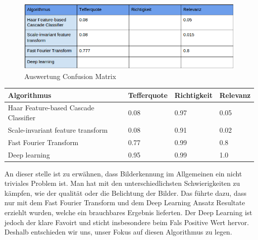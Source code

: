 \begin{figure}[ht]
\includegraphics[width=\textwidth]{images/auserwertung_conf.png}
\caption[Auswertung Confusion Matrix]{Auswertung Confusion Matrix}
\end{figure}

\begin{center}
    \begin{tabular}{ | p{3cm} | p{3cm}  | p{3cm} | p{3cm}  | }
    \hline    
    \rowcolor{lightblue}
	Algorithmus & Tefferquote & Richtigkeit & Relevanz \\ \hline
	Haar Feature-based Cascade Classifier & 0.08 & 0.97 & 0.05 \\ \hline
	Scale-invariant feature transform & 0.08 & 0.91 & 0.02 \\ \hline
	Fast Fourier Transform & 0.77 & 0.99 & 0.8 \\ \hline
	Deep learning & 0.95 & 0.99 & 1.0 \\ \hline
    \end{tabular}
\end{center}

An dieser stelle ist zu erwähnen, dass Bilderkennung im Allgemeinen ein nicht triviales Problem ist. Man hat mit den unterschiedlichsten Schwierigkeiten zu kämpfen, wie der qualität oder die Belichtung der Bilder. Das führte dazu, dass nur mit dem Fast Fourier Transform und dem Deep Learning Ansatz Resultate erziehlt wurden, welche ein brauchbares Ergebnis lieferten. Der Deep Learning ist jedoch der klare Favoirt und sticht insbesondere beim Fals Positive Wert hervor. Deshalb entschieden wir uns, unser Fokus auf diesen Algorithmus zu legen. 




